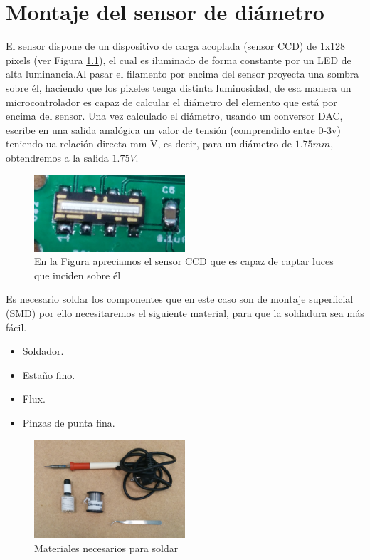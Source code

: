 \chapter{Montaje del sensor de diámetro}
\label{ane:sensor}

El sensor dispone de un dispositivo de carga acoplada (sensor CCD) de 1x128 pixels (ver Figura \ref{fig:sens_CCD}), el cual es iluminado de forma constante por un LED de alta luminancia.Al pasar el filamento por encima del sensor proyecta una sombra sobre él, haciendo que los pixeles tenga distinta luminosidad, de esa manera un microcontrolador es capaz de calcular el diámetro del elemento que está por encima del sensor. Una vez calculado el diámetro, usando un conversor DAC, escribe en una salida analógica un valor de tensión  (comprendido entre 0-3v) teniendo ua relación directa mm-V, es decir, para un diámetro de $1.75 mm$, obtendremos a la salida $1.75 V$.

\begin{figure}[H]
    \centering
    \includegraphics[width=0.5\textwidth]{images/sensor/IMG_20150414_135533_.jpg}
    \caption[Sensor CCD lineal.]{En la Figura apreciamos el sensor CCD que es capaz de captar luces que inciden sobre él}
    \label{fig:sens_CCD}
\end{figure}

Es necesario soldar los componentes que en este caso son de montaje superficial (SMD) por ello necesitaremos el siguiente material, para que la soldadura sea más fácil.

\begin{itemize}
	\item{Soldador.}
	\item{Estaño fino.}
	\item{Flux.}
	\item{Pinzas de punta fina.}
\end{itemize}

\begin{figure}[H]
    \centering
    \includegraphics[width=0.5\textwidth]{images/sensor/IMG_20150417_160216.jpg}
    \caption{Materiales necesarios para soldar}
    \label{fig:sens_materiales}
\end{figure}


